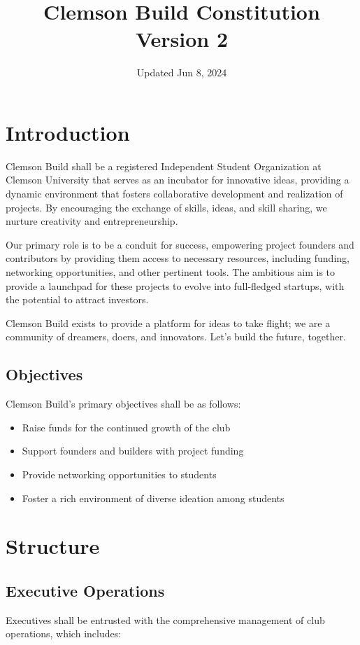 \documentclass{article}
\title{Clemson Build Constitution \\
\large Version 2}
\date{Updated Jun 8, 2024}
\begin{document}
\maketitle

\section{Introduction}
Clemson Build shall be a registered Independent Student Organization at Clemson University that serves as an incubator for innovative ideas, providing a dynamic environment that fosters collaborative development and realization of projects. By encouraging the exchange of skills, ideas, and skill sharing, we nurture creativity and entrepreneurship.

Our primary role is to be a conduit for success, empowering project founders and contributors by providing them access to necessary resources, including funding, networking opportunities, and other pertinent tools. The ambitious aim is to provide a launchpad for these projects to evolve into full-fledged startups, with the potential to attract investors.

Clemson Build exists to provide a platform for ideas to take flight; we are a community of dreamers, doers, and innovators. Let's build the future, together.
\subsection{Objectives}
Clemson Build's primary objectives shall be as follows:

\begin{itemize}
    \item{Raise funds for the continued growth of the club}
    \item{Support founders and builders with project funding}
    \item{Provide networking opportunities to students}
    \item{Foster a rich environment of diverse ideation among students}
\end{itemize}

\newpage

\section{Structure}

\subsection{Executive Operations}
Executives shall be entrusted with the comprehensive management of club operations, which includes:
\end{document}
